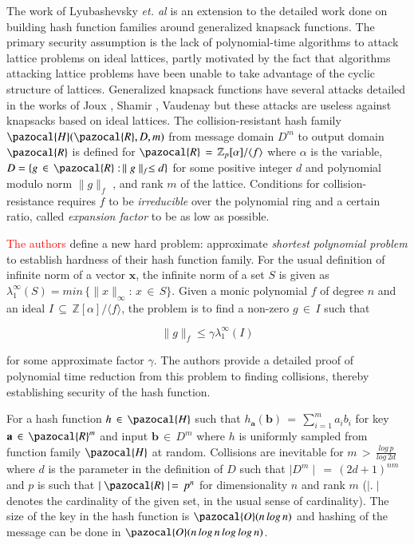 \documentclass[10pt]{elsarticle}
\begin{document}
The work of Lyubashevsky \textit{et. al}
\cite{CRHF_Lyubashevsky2006} is an extension to the detailed work
done on building hash function families around generalized knapsack
functions. The primary security assumption is the lack of
polynomial-time algorithms to attack lattice problems on ideal
lattices, partly motivated by the fact that algorithms attacking
lattice problems have been unable to take advantage of the cyclic
structure of lattices. Generalized knapsack functions have several
attacks detailed in the works of Joux \cite{CRHF_Joux1994}, Shamir
\cite{CRHF_Shamir1984_MH}, Vaudenay \cite{CRHF_Vaudenay2001} but
these attacks are useless against knapsacks based on ideal lattices.
The collision-resistant hash family $\pazocal{H}(\pazocal{R}, D, m)$
from message domain $D^{m}$ to output domain $\pazocal{R}$ is
defined for $\pazocal{R}\, = \, \mathbb{Z}_{p}[\alpha]/ \langle f
\rangle$ where $\alpha$ is the variable, $D = \{ g\,\in\,
\pazocal{R}:\,\parallel g\parallel_{f} \leq d \}$ for some positive
integer $d$ and polynomial modulo norm $\parallel g \parallel_{f}$
\textcolor{red}{\cite{give a citation here}}, and rank $m$ of the
lattice. Conditions for collision-resistance requires $f$ to be
\textit{irreducible} over the polynomial ring and a certain ratio,
called \textit{expansion factor} to be as low as possible.

\textcolor{red}{The authors \cite{give a citation here}} define a
new hard problem: approximate \textit{shortest polynomial problem}
to establish hardness of their hash function family. For the usual
definition of infinite norm of a vector $\mathbf{x}$, the infinite
norm of a set $S$ is given as $\lambda^{\infty}_{1}(S) =
min\,\{\parallel x\parallel_{\infty}:\,x\,\in\,S\}$. Given a monic
polynomial $f$ of degree $n$ and an ideal $I\,\subseteq \,
\mathbb{Z}[\alpha]/\langle f\rangle$, the problem is to find a
non-zero $g\,\in \,I$ such that

$$\parallel g\parallel_{f} \leq \gamma \lambda^{\infty}_{1}(I)$$

for some approximate factor $\gamma$. The authors provide a detailed proof of polynomial time reduction from this problem to finding collisions, thereby establishing security of the hash function.

For a hash function $h\,\in\, \pazocal{H}$ such that $h_{\mathbf{a}}(\mathbf{b})\,=\,\sum_{i=1}^{m}a_{i}b_{i}$ for key $\mathbf{a} \,\in\, \pazocal{R}^{m}$ and input $\mathbf{b} \,\in\,D^{m}$ where $h$ is uniformly sampled from function family $\pazocal{H}$ at random. Collisions are inevitable for $m\,>\,\frac{log\,p}{log\,2d}$ where $d$ is the parameter in the definition of $D$ such that $\mid D^{m}\mid \,=\, (2d + 1)^{nm}$ and $p$ is such that $\mid \pazocal{R}\mid \,=\,p^{n}$ for dimensionality $n$ and rank $m$ ($\mid .\mid$ denotes the cardinality of the given set, in the usual sense of cardinality). The size of the key in the hash function is $\pazocal{O}(n\,log\,n)$ and hashing of the message can be done in $\pazocal{O}(n\,log\,n\,log\,log\,n)$.
\end{document}
